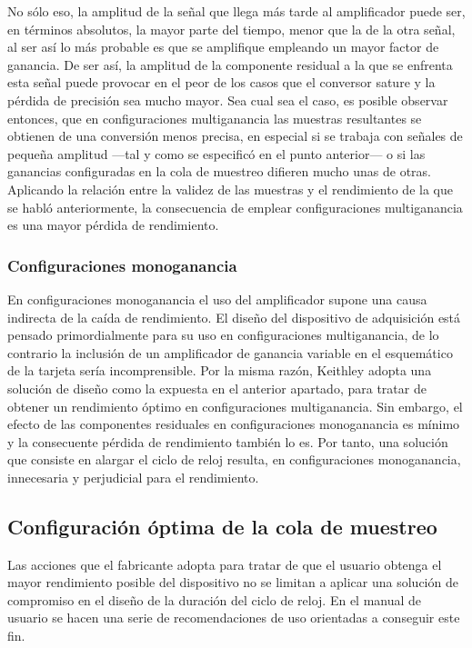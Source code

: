 No sólo eso, la amplitud de la señal que llega más tarde al amplificador
puede ser, en términos absolutos, la mayor parte del tiempo, menor que la
de la otra señal, al ser así lo más probable es que se amplifique empleando
un mayor factor de ganancia. De ser así, la amplitud de la componente
residual a la que se enfrenta esta señal puede provocar en el peor de los
casos que el conversor sature y la pérdida de precisión sea mucho mayor.
Sea cual sea el caso, es posible observar entonces, que en configuraciones
multiganancia las muestras resultantes se obtienen de una conversión menos
precisa, en especial si se trabaja con señales de pequeña amplitud ---tal y
como se especificó en el punto anterior--- o si las ganancias configuradas
en la cola de muestreo difieren mucho unas de otras. Aplicando la relación
entre la validez de las muestras y el rendimiento de la que se habló
anteriormente, la consecuencia de emplear configuraciones multiganancia es
una mayor pérdida de rendimiento.


\subsubsection{Configuraciones monoganancia}

En configuraciones monoganancia el uso del amplificador supone una causa
indirecta de la caída de rendimiento. El diseño del dispositivo de
adquisición está pensado primordialmente para su uso en configuraciones
multiganancia, de lo contrario la inclusión de un amplificador de ganancia
variable en el esquemático de la tarjeta sería incomprensible. Por la misma
razón, Keithley adopta una solución de diseño como la expuesta en el
anterior apartado, para tratar de obtener un rendimiento óptimo en
configuraciones multiganancia. Sin embargo, el efecto de las componentes
residuales en configuraciones monoganancia es mínimo y la consecuente
pérdida de rendimiento también lo es. Por tanto, una solución que consiste
en alargar el ciclo de reloj resulta, en configuraciones monoganancia,
innecesaria y perjudicial para el rendimiento.


\subsection{Configuración óptima de la cola de muestreo}

Las acciones que el fabricante adopta para tratar de que el usuario obtenga
el mayor rendimiento posible del dispositivo no se limitan a aplicar una
solución de compromiso en el diseño de la duración del ciclo de reloj. En
el manual de usuario se hacen una serie de recomendaciones de uso
orientadas a conseguir este fin.

